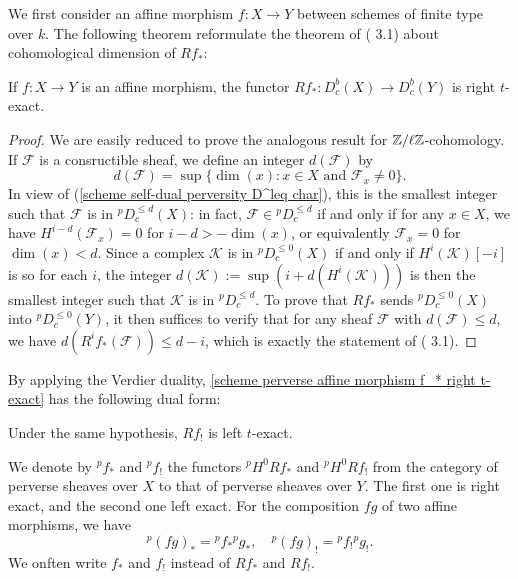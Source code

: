 We first consider an affine morphism $f:X\to Y$ between schemes of finite type over $k$. The following theorem reformulate the theorem of (\cite{SGA4-3}  3.1) about cohomological dimension of $Rf_*$:

\begin{theorem}\label{scheme perverse affine morphism f_* right t-exact}
If $f:X\to Y$ is an affine morphism, the functor $Rf_*:D^b_c(X)\to D^b_c(Y)$ is right $t$-exact.
\end{theorem}
\begin{proof}
We are easily reduced to prove the analogous result for $\mathbb{Z}/\ell\mathbb{Z}$-cohomology. If $\mathscr{F}$ is a consructible sheaf, we define an integer $d(\mathscr{F})$ by
\[d(\mathscr{F})=\sup\{\dim(x):\text{$x\in X$ and $\mathscr{F}_x\neq 0$}\}.\]
In view of (\ref{scheme self-dual perversity D^leq char}), this is the smallest integer such that $\mathscr{F}$ is in ${^p\!D_c^{\leq d}}(X)$: in fact, $\mathscr{F}\in{^p\!D_c^{\leq d}}$ if and only if for any $x\in X$, we have $H^{i-d}(\mathscr{F}_x)=0$ for $i-d>-\dim(x)$, or equivalently $\mathscr{F}_x=0$ for $\dim(x)<d$. Since a complex $\mathscr{K}$ is in ${^p\!D_c^{\leq 0}}(X)$ if and only if $H^i(\mathscr{K})[-i]$ is so for each $i$, the integer $d(\mathscr{K}):=\sup(i+d(H^i(\mathscr{K})))$ is then the smallest integer such that $\mathscr{K}$ is in ${^p\!D_c^{\leq d}}$. To prove that $Rf_*$ sends ${^p\!D_c^{\leq 0}}(X)$ into ${^p\!D_c^{\leq 0}}(Y)$, it then suffices to verify that for any sheaf $\mathscr{F}$ with $d(\mathscr{F})\leq d$, we have $d(R^if_*(\mathscr{F}))\leq d-i$, which is exactly the statement of (\cite{SGA4-3}  3.1).
\end{proof}

By applying the Verdier duality, \cref{scheme perverse affine morphism f_* right t-exact} has the following dual form:

\begin{corollary}\label{scheme perverse affine morphism f_! right t-exact}
Under the same hypothesis, $Rf_!$ is left $t$-exact.
\end{corollary}

We denote by ${^p\!f_*}$ and ${^p\!f_!}$ the functors ${^p\!H^0Rf_*}$ and ${^p\!H^0Rf_!}$ from the category of perverse sheaves over $X$ to that of perverse sheaves over $Y$. The first one is right exact, and the second one left exact. For the composition $fg$ of two affine morphisms, we have
\[{^p\!(fg)_*}={^p\!f_*}{^p\!g_*},\quad {^p\!(fg)_!}={^p\!f_!}{^p\!g_!}.\]
We onften write $f_*$ and $f_!$ instead of $Rf_*$ and $Rf_!$.

